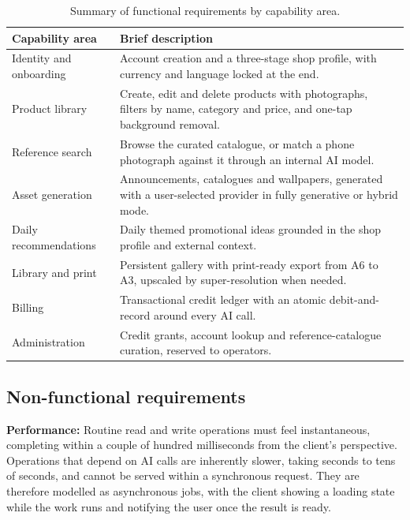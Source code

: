 \begin{table}[ht]
\centering
\caption{Summary of functional requirements by capability area.}
\label{tab:functional-requirements}
\small
\renewcommand{\arraystretch}{1.3}
\begin{tabularx}{\textwidth}{|>{\raggedright\arraybackslash}p{3.6cm}|Y|}
\hline
\textbf{Capability area} & \textbf{Brief description} \\
\hline
Identity and onboarding & Account creation and a three-stage shop profile, with currency and language locked at the end. \\
\hline
Product library         & Create, edit and delete products with photographs, filters by name, category and price, and one-tap background removal. \\
\hline
Reference search        & Browse the curated catalogue, or match a phone photograph against it through an internal AI model. \\
\hline
Asset generation        & Announcements, catalogues and wallpapers, generated with a user-selected provider in fully generative or hybrid mode. \\
\hline
Daily recommendations   & Daily themed promotional ideas grounded in the shop profile and external context. \\
\hline
Library and print       & Persistent gallery with print-ready export from A6 to A3, upscaled by super-resolution when needed. \\
\hline
Billing                 & Transactional credit ledger with an atomic debit-and-record around every AI call. \\
\hline
Administration          & Credit grants, account lookup and reference-catalogue curation, reserved to operators. \\
\hline
\end{tabularx}
\end{table}

\subsection{Non-functional requirements}
\label{subsec:nonfunctional-requirements}

\textbf{Performance:} Routine read and write operations must feel instantaneous, completing within a couple of hundred milliseconds from the client's perspective. Operations that depend on AI calls are inherently slower, taking seconds to tens of seconds, and cannot be served within a synchronous request. They are therefore modelled as asynchronous jobs, with the client showing a loading state while the work runs and notifying the user once the result is ready.

